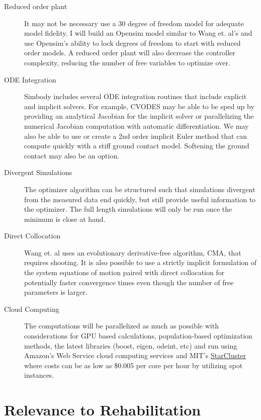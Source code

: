 \documentclass[11pt]{article}
\begin{document}
\begin{description}
  \item[Reduced order plant] It may not be necessary use a 30 degree of freedom
    model for adequate model fidelity. I will build an Opensim model similar to
    Wang et. al's and use Opensim's ability to lock degrees of freedom to start
    with reduced order models. A reduced order plant will also decrease the
    controller complexity, reducing the number of free variables to optimize
    over.
  \item[ODE Integration] Simbody includes several ODE integration routines that
    include explicit and implicit solvers. For example, CVODES may be able to
    be sped up by providing an analytical Jacobian for the implicit solver or
    parallelizing the numerical Jacobian computation with automatic
    differentiation. We may also be able to use or create a 2nd order implicit
    Euler method that can compute quickly with a stiff ground contact model.
    Softening the ground contact may also be an option.
  \item[Divergent Simulations] The optimizer algorithm can be structured such
    that simulations divergent from the measured data end quickly, but still
    provide useful information to the optimizer. The full length simulations
    will only be run once the minimum is close at hand.
  \item[Direct Collocation] Wang et. al uses an evolutionary derivative-free
    algorithm, CMA, that requires shooting. It is also possible to use a
    strictly implicit formulation of the system equations of motion paired with
    direct collocation \cite{Ackermann2010} for potentially faster convergence
    times even though the number of free parameters is larger.
  \item[Cloud Computing] The computations will be parallelized as much as
    possible with considerations for GPU based calculations, population-based
    optimization methods, the latest libraries (boost, eigen, odeint, etc) and
    run using Amazon's Web Service cloud computing services and MIT's
    \href{http://star.mit.edu/cluster/}{StarCluster} where costs can be as low
    as \$0.005 per core per hour by utilizing spot instances.
\end{description}

\section*{Relevance to Rehabilitation}
\end{document}
